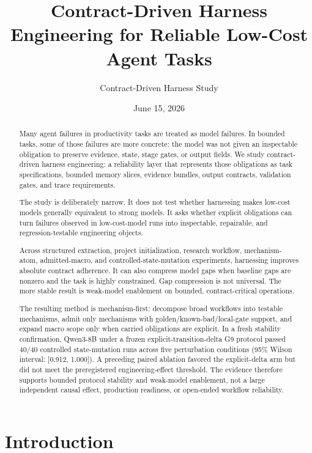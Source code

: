 \documentclass[11pt]{article}
\title{Contract-Driven Harness Engineering for Reliable Low-Cost Agent Tasks}
\author{Contract-Driven Harness Study}
\date{June 15, 2026}
\begin{document}
\maketitle

\begin{abstract}

Many agent failures in productivity tasks are treated as model failures. In bounded tasks, some of those failures are more concrete: the model was not given an inspectable obligation to preserve evidence, state, stage gates, or output fields. We study contract-driven harness engineering: a reliability layer that represents those obligations as task specifications, bounded memory slices, evidence bundles, output contracts, validation gates, and trace requirements.

The study is deliberately narrow. It does not test whether harnessing makes low-cost models generally equivalent to strong models. It asks whether explicit obligations can turn failures observed in low-cost-model runs into inspectable, repairable, and regression-testable engineering objects.

Across structured extraction, project initialization, research workflow, mechanism-atom, admitted-macro, and controlled-state-mutation experiments, harnessing improves absolute contract adherence. It can also compress model gaps when baseline gaps are nonzero and the task is highly constrained. Gap compression is not universal. The more stable result is weak-model enablement on bounded, contract-critical operations.

The resulting method is mechanism-first: decompose broad workflows into testable mechanisms, admit only mechanisms with golden/known-bad/local-gate support, and expand macro scope only when carried obligations are explicit. In a fresh stability confirmation, Qwen3-8B under a frozen explicit-transition-delta G9 protocol passed 40/40 controlled state-mutation runs across five perturbation conditions (95\% Wilson interval: [0.912, 1.000]). A preceding paired ablation favored the explicit-delta arm but did not meet the preregistered engineering-effect threshold. The evidence therefore supports bounded protocol stability and weak-model enablement, not a large independent causal effect, production readiness, or open-ended workflow reliability.

\end{abstract}

\section{Introduction}
\end{document}
